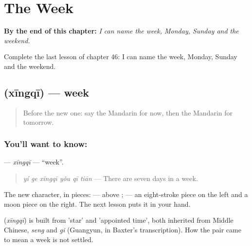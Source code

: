 
\chapter{The Week}
\label{ch:zh-the-week}

\begin{chapteropening}
\textbf{By the end of this chapter:} \emph{I can name the week, Monday, Sunday and the weekend.}

Complete the last lesson of chapter 46: I can name the week, Monday, Sunday and the weekend.
\end{chapteropening}

\section[\texorpdfstring{\zh{星期} (xīngqī)}{星期 (xīngqī)}]{ (xīngqī) — week}

\label{lesson:ZH-C46-xingqi}



\begin{quote}
Before the new one: say the Mandarin for now, then the Mandarin for tomorrow.
\end{quote}

\subsection*{You'll want to know: }
\textbf{} — \emph{xīngqī} — \textquotedblleft{}week\textquotedblright{}.

\begin{quote}
\textbf{} \emph{yí ge xīngqī yǒu qī tiān} — There are seven days in a week.
\end{quote}

The new character, in pieces:  —  above ;  — an eight-stroke piece on the left and a moon piece on the right. The next lesson puts it in your hand.

\begin{cousinweb}
\textbf{} (\emph{xīngqī}) is built from  'star' and  'appointed time', both inherited from Middle Chinese, \emph{seng} and \emph{gi} (Guangyun, in Baxter's transcription). How the pair came to mean a week is not settled.
\end{cousinweb}

